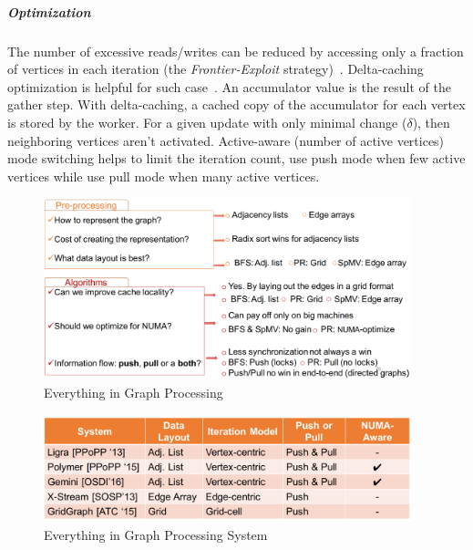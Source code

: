 \documentclass[UTF8,12pt,a4paper]{article}
\begin{document}
\subparagraph{Optimization} The number of excessive reads/writes can be reduced by
accessing only a fraction of vertices in each iteration
(the \textit{Frontier-Exploit} strategy)~\cite{DBLP:conf/hpdc/BestaPGSH17}.
Delta-caching optimization is helpful for such case~\cite{DBLP:conf/osdi/GonzalezLGBG12}.
An accumulator value is the result of the gather step.
With delta-caching, a cached copy of the accumulator for each vertex is stored by the worker.
For a given update with only minimal change ($\delta$),
then neighboring vertices aren’t activated.
Active-aware (number of active vertices) mode switching helps to limit the iteration count,
use push mode when few active vertices while use pull mode when many active vertices.

\begin{figure}
  \begin{small}
    \begin{center}
      \includegraphics[width=0.95\textwidth]{figures/graph_atc17_everythinggraph1}
    \end{center}
    \caption{Everything in Graph Processing~\cite{DBLP:conf/usenix/MalicevicLZ17}}
    \label{fig:everythinggraph1}
  \end{small}
\end{figure}
\begin{figure}
  \begin{small}
    \begin{center}
      \includegraphics[width=0.95\textwidth]{figures/graph_atc17_everythinggraph2}
    \end{center}
    \caption{Everything in Graph Processing System~\cite{DBLP:conf/usenix/MalicevicLZ17}}
    \label{fig:everythinggraph2}
  \end{small}
\end{figure}
\end{document}
